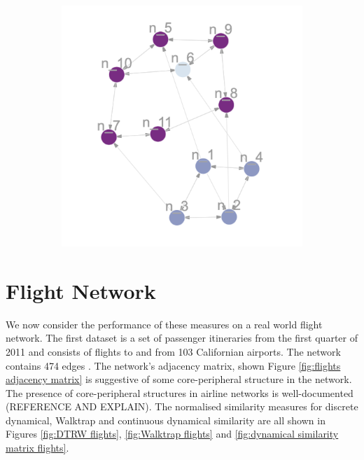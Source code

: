 \documentclass[12pt,a4paper]{article}
\begin{document}
\begin{figure}[H]
\begin{subfigure}[b]{0.3\textwidth}
    \caption{}
    \label{fig:wt t20k3}
  \end{subfigure}
  \hfill
  \begin{subfigure}[b]{0.3\textwidth}
    \centering
    \includegraphics[width=\textwidth]{toy_net/dynamical similarity t20.png}
    \caption{}
    \label{fig:dynsim t20k3}
  \end{subfigure}
  \caption{}
  \label{fig:toy net predictions t20}
\end{figure}

\section{Flight Network}
We now consider the performance of these measures on a real world flight network. The first dataset is a set of passenger itineraries from the first quarter of 2011 and consists of flights to and from 103 Californian airports. The network contains 474 edges \cite{flightdata}. The network's adjacency matrix, shown Figure \ref{fig:flights adjacency matrix} is suggestive of some core-peripheral structure in the network. The presence of core-peripheral structures in airline networks is well-documented (REFERENCE AND EXPLAIN). The normalised similarity measures for discrete dynamical, Walktrap and continuous dynamical similarity are all shown in Figures \ref{fig:DTRW flights}, \ref{fig:Walktrap flights} and \ref{fig:dynamical similarity matrix flights}.
\end{document}
